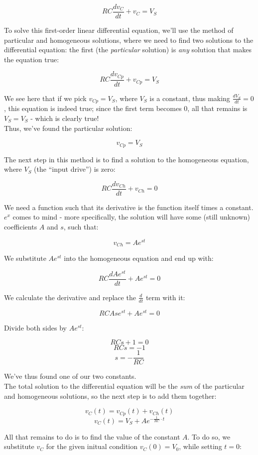 \documentclass[12pt,a4paper]{report}
\begin{document}
\[ RC \frac{dv_C}{dt} + v_C = V_S \]

To solve this first-order linear differential equation, we'll use the method of particular and homogeneous solutions, where we need to find two solutions to the differential equation: the first (the \emph{particular} solution) is \emph{any} solution that makes the equation true:

\[ RC \frac{dv_{Cp}}{dt} + v_{Cp} = V_S \]

We see here that if we pick $v_{Cp} = V_S$, where $V_S$ is a constant, thus making $\frac{dV_S}{dt} = 0$, this equation is indeed true; since the first term becomes 0, all that remains is $V_S = V_S$ - which is clearly true!\\
Thus, we've found the particular solution:

\[ v_{Cp} = V_S \]

The next step in this method is to find a solution to the homogeneous equation, where $V_S$ (the ``input drive'') is zero:

\[ RC \frac{dv_{Ch}}{dt} + v_{Ch} = 0 \]

We need a function such that its derivative is the function itself times a constant. $e^x$ comes to mind - more specifically, the solution will have some (still unknown) coefficients $A$ and $s$, such that:

\[ v_{Ch} = Ae^{st} \]

We substitute $Ae^{st}$ into the homogeneous equation and end up with:

\[ RC \frac{dAe^{st}}{dt} + Ae^{st} = 0 \]

We calculate the derivative and replace the $\frac{d}{dt}$ term with it:

\[ RCAs e^{st}  +Ae^{st} = 0 \]

Divide both sides by $Ae^{st}$:

\[ RCs + 1 = 0 \]
\[ RCs = -1 \]
\[ s = -\frac{1}{RC} \]

We've thus found one of our two constants.\\
The total solution to the differential equation will be the \emph{sum} of the particular and homogeneous solutions, so the next step is to add them together:

\[ v_C(t) = v_{Cp}(t) + v_{Ch}(t) \]
\[ v_C(t) = V_S + Ae^{-\frac{1}{RC} \cdot t} \]

All that remains to do is to find the value of the constant $A$. To do so, we substitute $v_C$ for the given initual condition $v_C(0) = V_0$, while setting $t = 0$:
\end{document}
